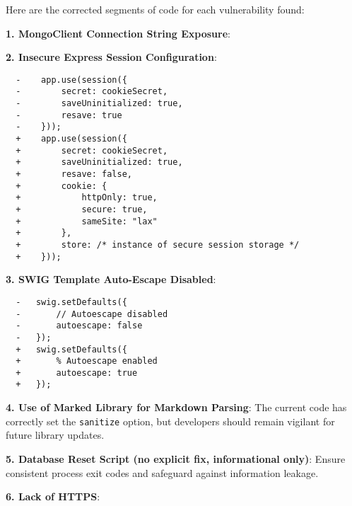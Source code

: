   Here are the corrected segments of code for each vulnerability found:
  
  \textbf{1. MongoClient Connection String Exposure}:
  
  \begin{framed}\scriptsize
  \begin{Highlighting}[]
  \end{Highlighting}
  \end{framed}\normalsize
  
  \textbf{2. Insecure Express Session Configuration}:
  
  \begin{framed}\scriptsize 
  \begin{verbatim}
  -    app.use(session({
  -        secret: cookieSecret,
  -        saveUninitialized: true,
  -        resave: true
  -    }));
  +    app.use(session({
  +        secret: cookieSecret,
  +        saveUninitialized: true,
  +        resave: false,
  +        cookie: {
  +            httpOnly: true,
  +            secure: true,
  +            sameSite: "lax"
  +        },
  +        store: /* instance of secure session storage */
  +    }));
  \end{verbatim}
  \end{framed}
  
  \textbf{3. SWIG Template Auto-Escape Disabled}:

  \begin{framed}\scriptsize 
  \begin{verbatim}
  -   swig.setDefaults({
  -       // Autoescape disabled
  -       autoescape: false
  -   });
  +   swig.setDefaults({
  +       % Autoescape enabled
  +       autoescape: true
  +   });
  \end{verbatim}
  \end{framed}

  
  \textbf{4. Use of Marked Library for Markdown Parsing}: The current code
  has correctly set the \texttt{sanitize} option, but developers should
  remain vigilant for future library updates.
  
  \textbf{5. Database Reset Script (no explicit fix, informational only)}:
  Ensure consistent process exit codes and safeguard against information
  leakage.
  
  \textbf{6. Lack of HTTPS}:
  
